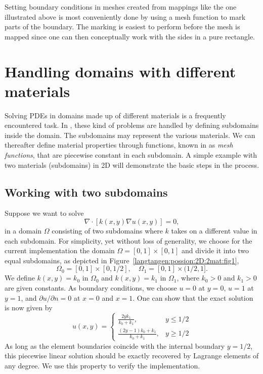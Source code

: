 Setting boundary conditions in meshes created from mappings like the
one illustrated above is most conveniently done by using a mesh function
to mark parts of the boundary. The marking is easiest to perform before
the mesh is mapped since one can then conceptually work with the sides
in a pure rectangle.

\section{Handling domains with different materials}

Solving PDEs in domains made up of different materials is a frequently
encountered task. In \fenics, these kind of problems are handled by
defining subdomains inside the domain. The subdomains may represent
the various materials. We can thereafter define material properties
through functions, known in \fenics{} as \emph{mesh functions}, that are
piecewise constant in each subdomain.  A simple example with two materials
(subdomains) in 2D will demonstrate the basic steps in the process.

\subsection{Working with two subdomains}
\label{langtangen:possion:2D:2mat:problem}

Suppose we want to solve
\begin{equation} \label{langtangen:poisson:2D:2mat:varcoeff2}
  \nabla\cdot \left\lbrack k(x,y)\nabla u(x,y)\right\rbrack = 0,
\end{equation}
in a domain $\Omega$ consisting of two subdomains where $k$ takes on
a different value in each subdomain.
For simplicity, yet without loss of generality, we choose for the current
implementation
the domain $\Omega = [0,1]\times [0,1]$ and divide it into two equal
subdomains, as depicted in Figure~\ref{langtangen:possion:2D:2mat:fig1},
\begin{equation}
 \Omega_0 = [0, 1]\times [0,1/2],\quad \Omega_1 = [0, 1]\times (1/2,1].
\end{equation}
We define $k(x,y)=k_0$ in $\Omega_0$ and $k(x,y)=k_1$ in $\Omega_1$,
where $k_0>0$ and $k_1>0$ are given constants.  As boundary conditions,
we choose $u=0$ at $y=0$, $u=1$ at $y=1$, and $\partial u/\partial n=0$
at $x=0$ and $x=1$.  One can show that the exact solution is now given by
\begin{equation}
u(x, y) = \left\lbrace\begin{array}{ll}
\frac{2yk_1}{k_0+k_1}, & y \leqslant 1/2\\
\frac{(2y-1)k_0 + k_1}{k_0+k_1}, & y \geqslant 1/2
\end{array}\right.
\end{equation}
As long as the element boundaries coincide with the internal boundary
$y=1/2$, this piecewise linear solution should be exactly recovered
by Lagrange elements of any degree. We use this property to verify the
implementation.


